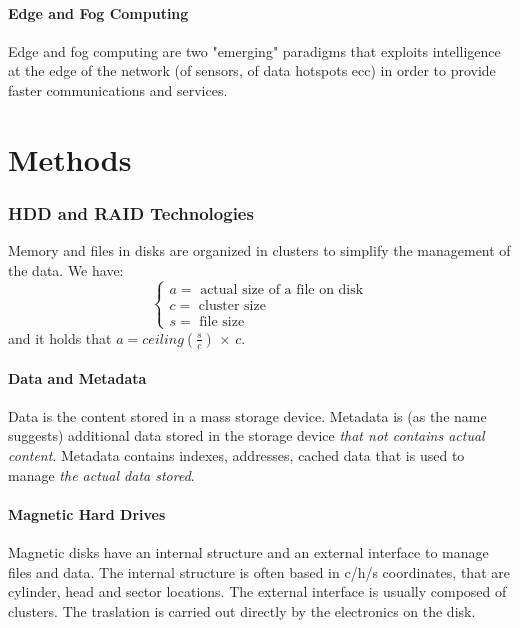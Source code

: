 \documentclass[10pt,a4paper]{article}
\begin{document}
			\subsection{Edge and Fog Computing}
				Edge and fog computing are two "emerging" paradigms that exploits intelligence at the edge of the network (of sensors, of data hotspots ecc) in order to provide faster communications and services.
			
	\clearpage \part{Methods}
		\section{HDD and RAID Technologies}
			Memory and files in disks are organized in clusters to simplify the management of the data. We have:
			\begin{equation}
				\begin{cases}
					a = \text{ actual size of a file on disk}\\
					c = \text{ cluster size}\\
					s = \text{ file size}
				\end{cases}
			\end{equation}
			and it holds that $ a = ceiling(\frac{s}{c}) \,\times\, c$.
			
			\subsection{Data and Metadata}
				Data is the content stored in a mass storage device. Metadata is (as the name suggests) additional data stored in the storage device \emph{that not contains actual content}. Metadata contains indexes, addresses, cached data that is used to manage \emph{the actual data stored}.
				
			\subsection{Magnetic Hard Drives}
				Magnetic disks have an internal structure and an external interface to manage files and data. The internal structure is often based in c/h/s coordinates, that are cylinder, head and sector locations. The external interface is usually composed of clusters. The traslation is carried out directly by the electronics on the disk.
				
\end{document}
